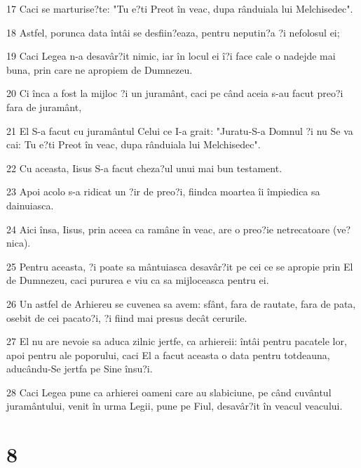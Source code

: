 \par 17 Caci se marturise?te: "Tu e?ti Preot în veac, dupa rânduiala lui Melchisedec".
\par 18 Astfel, porunca data întâi se desfiin?eaza, pentru neputin?a ?i nefolosul ei;
\par 19 Caci Legea n-a desavâr?it nimic, iar în locul ei î?i face cale o nadejde mai buna, prin care ne apropiem de Dumnezeu.
\par 20 Ci înca a fost la mijloc ?i un juramânt, caci pe când aceia s-au facut preo?i fara de juramânt,
\par 21 El S-a facut cu juramântul Celui ce I-a grait: "Juratu-S-a Domnul ?i nu Se va cai: Tu e?ti Preot în veac, dupa rânduiala lui Melchisedec".
\par 22 Cu aceasta, Iisus S-a facut cheza?ul unui mai bun testament.
\par 23 Apoi acolo s-a ridicat un ?ir de preo?i, fiindca moartea îi împiedica sa dainuiasca.
\par 24 Aici însa, Iisus, prin aceea ca ramâne în veac, are o preo?ie netrecatoare (ve?nica).
\par 25 Pentru aceasta, ?i poate sa mântuiasca desavâr?it pe cei ce se apropie prin El de Dumnezeu, caci pururea e viu ca sa mijloceasca pentru ei.
\par 26 Un astfel de Arhiereu se cuvenea sa avem: sfânt, fara de rautate, fara de pata, osebit de cei pacato?i, ?i fiind mai presus decât cerurile.
\par 27 El nu are nevoie sa aduca zilnic jertfe, ca arhiereii: întâi pentru pacatele lor, apoi pentru ale poporului, caci El a facut aceasta o data pentru totdeauna, aducându-Se jertfa pe Sine însu?i.
\par 28 Caci Legea pune ca arhierei oameni care au slabiciune, pe când cuvântul juramântului, venit în urma Legii, pune pe Fiul, desavâr?it în veacul veacului.

\chapter{8}

